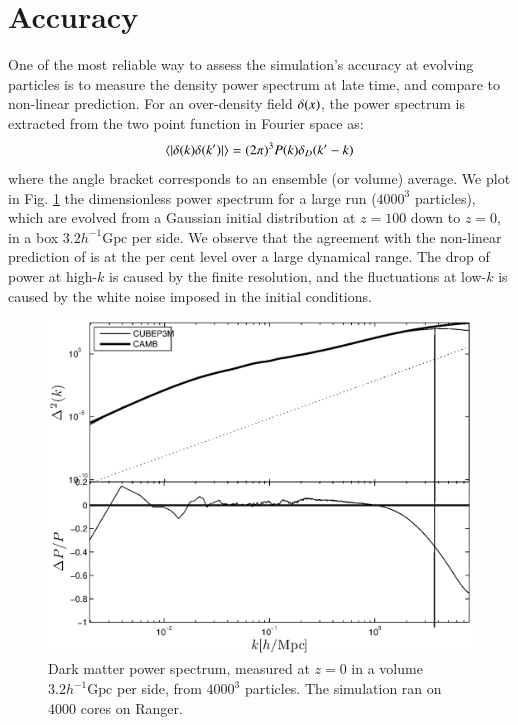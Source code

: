 \section{Accuracy}
\label{sec:accuracy}
 
One of the most reliable way to assess the simulation's accuracy at evolving particles
is to measure the density power spectrum at late time, and compare to non-linear prediction. 
For an over-density field $\delta({\bf \it x})$, the power spectrum is extracted from the two point function in Fourier space as:
\begin{eqnarray}
\langle | \delta ({\bf \it k}) \delta ({\bf \it k'}) | \rangle = (2\pi)^{3}P(k)\delta_{D}({\bf \it k'} - {\bf \it k})
\label{eq:power}
\end{eqnarray}
where the angle bracket corresponds to an ensemble (or volume) average.
We plot in Fig. \ref{fig:power_highres} the dimensionless power spectrum for a large run ($4000^3$ particles),
which are evolved from a Gaussian initial distribution at $z=100$ down to $z=0$, in a box $3.2 h^{-1}\mbox{Gpc}$ per side.
We observe that the agreement with the non-linear prediction of \cite{Lewis} is at the per cent level over a large dynamical range.
The drop of power at high-$k$ is caused by the finite resolution, and the fluctuations at low-$k$ is caused by the white noise imposed
in the initial conditions. 

\begin{figure}%
  \begin{center}
    \includegraphics[width=5.2in]{graphs/power_highres.eps}
  \caption{Dark matter power spectrum, measured at $z=0$ in a volume $3.2 h^{-1}\mbox{Gpc}$ per side,
  from $4000^3$ particles. The simulation ran on 4000 cores on Ranger.
    \label{fig:power_highres}}
\end{center}
\end{figure}

